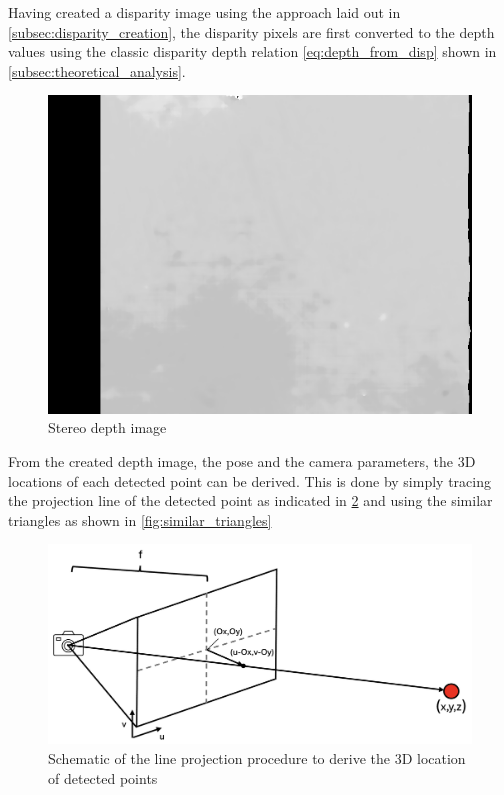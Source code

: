 Having created a disparity image using the approach laid out in \cref{subsec:disparity_creation}, the disparity pixels are first converted to the depth values using the classic disparity depth relation \ref{eq:depth_from_disp} shown in \cref{subsec:theoretical_analysis}.

\begin{figure}[h]
\centering
\includegraphics[scale=0.5]{images/stereo_camera_depth/stereo_depth.png}
\caption{Stereo depth image}
\label{fig:stereo_depth}
\end{figure}

From the created depth image, the pose and the camera parameters, the 3D locations of each detected point can be derived. This is done by simply tracing the projection line of the detected point as indicated in \cref{fig:line_projection} and using the similar triangles as shown in \cref{fig:similar_triangles}

\begin{figure}[h]
\centering
\includegraphics[scale=0.25]{images/stereo_camera_depth/projection.png}
\caption{Schematic of the line projection procedure to derive the 3D location of detected points}
\label{fig:line_projection}
\end{figure}

